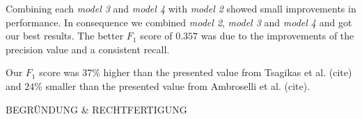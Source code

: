 Combining each \textit{model 3} and \textit{model 4} with \textit{model 2} showed small improvements in performance. In consequence we combined \textit{model 2}, \textit{model 3} and \textit{model 4} and got our best results. The better $F_1$ score of $0.357$ was due to the improvements of the precision value and a consistent recall.

Our $F_1$ score was $37\%$ higher than the presented value from Tsagikas et al. (cite) and $24\%$ smaller than the presented value from Ambroselli et al. (cite).

BEGRÜNDUNG \& RECHTFERTIGUNG



